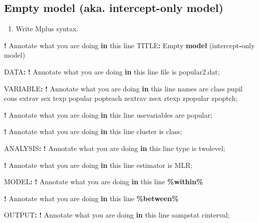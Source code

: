 \documentclass[
]{book}
\newenvironment{Shaded}{\begin{snugshade}}{\end{snugshade}}
\newcommand{\ControlFlowTok}[1]{\textcolor[rgb]{0.13,0.29,0.53}{\textbf{#1}}}
\newcommand{\FunctionTok}[1]{\textcolor[rgb]{0.13,0.29,0.53}{\textbf{#1}}}
\newcommand{\NormalTok}[1]{#1}
\newcommand{\SpecialCharTok}[1]{\textcolor[rgb]{0.81,0.36,0.00}{\textbf{#1}}}
\providecommand{\tightlist}{%
  \setlength{\itemsep}{0pt}\setlength{\parskip}{0pt}}
\begin{document}
\hypertarget{empty-model-aka.-intercept-only-model}{%
\subsection{Empty model (aka. intercept-only model)}\label{empty-model-aka.-intercept-only-model}}

\begin{enumerate}
\def\labelenumi{\arabic{enumi}.}
\tightlist
\item
  Write Mplus syntax.
\end{enumerate}

\begin{Shaded}
\begin{Highlighting}[]
\SpecialCharTok{!}\NormalTok{ Annotate what you are doing }\ControlFlowTok{in}\NormalTok{ this line}
\NormalTok{TITLE}\SpecialCharTok{:}\NormalTok{ Empty }\FunctionTok{model}\NormalTok{ (intercept}\SpecialCharTok{{-}}\NormalTok{only model)}

\NormalTok{DATA}\SpecialCharTok{:}
    \SpecialCharTok{!}\NormalTok{ Annotate what you are doing }\ControlFlowTok{in}\NormalTok{ this line}
\NormalTok{    file is popular2.dat;}

\NormalTok{VARIABLE}\SpecialCharTok{:}
    \SpecialCharTok{!}\NormalTok{ Annotate what you are doing }\ControlFlowTok{in}\NormalTok{ this line}
\NormalTok{    names are class pupil cons extrav sex texp popular popteach zextrav}
\NormalTok{    zsex ztexp zpopular zpoptch;}
    
    \SpecialCharTok{!}\NormalTok{ Annotate what you are doing }\ControlFlowTok{in}\NormalTok{ this line}
\NormalTok{    usevariables are popular;}
    
    \SpecialCharTok{!}\NormalTok{ Annotate what you are doing }\ControlFlowTok{in}\NormalTok{ this line}
\NormalTok{    cluster is class;}

\NormalTok{ANALYSIS}\SpecialCharTok{:}
    \SpecialCharTok{!}\NormalTok{ Annotate what you are doing }\ControlFlowTok{in}\NormalTok{ this line}
\NormalTok{    type is twolevel;}
    
    \SpecialCharTok{!}\NormalTok{ Annotate what you are doing }\ControlFlowTok{in}\NormalTok{ this line}
\NormalTok{    estimator is MLR;}

\NormalTok{MODEL}\SpecialCharTok{:}
    \SpecialCharTok{!}\NormalTok{ Annotate what you are doing }\ControlFlowTok{in}\NormalTok{ this line}
    \SpecialCharTok{\%within\%}

    \SpecialCharTok{!}\NormalTok{ Annotate what you are doing }\ControlFlowTok{in}\NormalTok{ this line}
    \SpecialCharTok{\%between\%}

\NormalTok{OUTPUT}\SpecialCharTok{:}
    \SpecialCharTok{!}\NormalTok{ Annotate what you are doing }\ControlFlowTok{in}\NormalTok{ this line}
\NormalTok{    sampstat cinterval;}
\end{Highlighting}
\end{Shaded}
\end{document}
